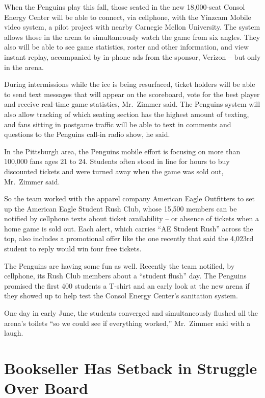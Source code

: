 ﻿\documentclass[12pt]{article}
\begin{document}
When the Penguins play this fall, those seated in the new 18,000-seat Consol Energy Center will be
able to connect, via cellphone, with the Yinzcam Mobile video system, a pilot project with nearby
Carnegie Mellon University. The system allows those in the arena to simultaneously watch the game
from six angles. They also will be able to see game statistics, roster and other information, and
view instant replay, accompanied by in-phone ads from the sponsor, Verizon -- but only in the arena.

During intermissions while the ice is being resurfaced, ticket holders will be able to send text
messages that will appear on the scoreboard, vote for the best player and receive real-time game
statistics, Mr.~Zimmer said. The Penguins system will also allow tracking of which seating section
has the highest amount of texting, and fans sitting in postgame traffic will be able to text in
comments and questions to the Penguins call-in radio show, he said.

In the Pittsburgh area, the Penguins mobile effort is focusing on more than 100,000 fans ages 21 to
24. Students often stood in line for hours to buy discounted tickets and were turned away when the
game was sold out, Mr.~Zimmer said.

So the team worked with the apparel company American Eagle Outfitters to set up the American Eagle
Student Rush Club, whose 15,500 members can be notified by cellphone texts about ticket availability
-- or absence of tickets when a home game is sold out. Each alert, which carries ``AE Student Rush''
across the top, also includes a promotional offer like the one recently that said the 4,023rd
student to reply would win four free tickets.

The Penguins are having some fun as well. Recently the team notified, by cellphone, its Rush Club
members about a ``student flush'' day. The Penguins promised the first 400 students a T-shirt and an
early look at the new arena if they showed up to help test the Consol Energy Center's sanitation
system.

One day in early June, the students converged and simultaneously flushed all the arena's toilets
``so we could see if everything worked,'' Mr.~Zimmer said with a laugh.

\pagebreak
\section{Bookseller Has Setback in Struggle Over Board}
\end{document}
